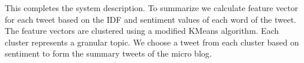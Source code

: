 This completes the system description. To summarize we calculate feature vector for each tweet based on the IDF and sentiment values of each word of the tweet. The feature vectors are clustered using a modified KMeans algorithm. Each cluster represents a granular topic. We choose a tweet from each cluster based on sentiment to form the summary tweets of the micro blog. 





